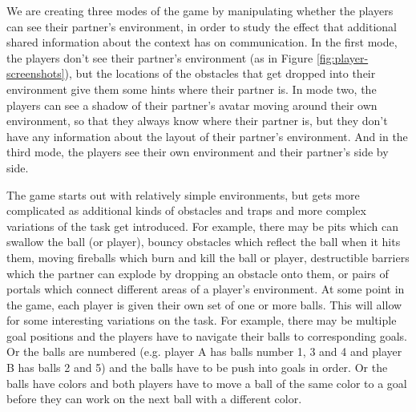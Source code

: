 
We are creating three modes of the game by manipulating whether the
players can see their partner's environment, in order to study the
effect that additional shared information about the context has on
communication.  In the first mode, the players don't see their
partner's environment (as in Figure \ref{fig:player-screenshots}), but
the locations of the obstacles that get dropped into their environment give
them some hints where their partner is. In mode two, the players can
see a shadow of their partner's avatar moving around their own
environment, so that they always know where their partner is, but they
don't have any information about the layout of their partner's
environment. And in the third mode, the players see their
own environment and their partner's side by side.



The game starts out with relatively simple environments, but gets more
complicated as additional kinds of obstacles and traps and more
complex variations of the task get introduced.  For example, there may
be pits which can swallow the ball (or player), bouncy obstacles which
reflect the ball when it hits them, moving fireballs which burn and
kill the ball or player, destructible barriers which the partner can
explode by dropping an obstacle onto them, or pairs of portals which
connect different areas of a player's environment.
At some point in the game, each player is given their own set of one
or more balls. This will allow for some interesting variations on the
task. For example, there may be multiple goal positions and the
players have to navigate their balls to corresponding goals. Or the
balls are numbered (e.g. player A has balls number 1, 3 and 4 and
player B has balls 2 and 5) and the balls have to be push into goals
in order. Or the balls have colors and both players have to move a
ball of the same color to a goal before they can work on the next ball
with a different color.


